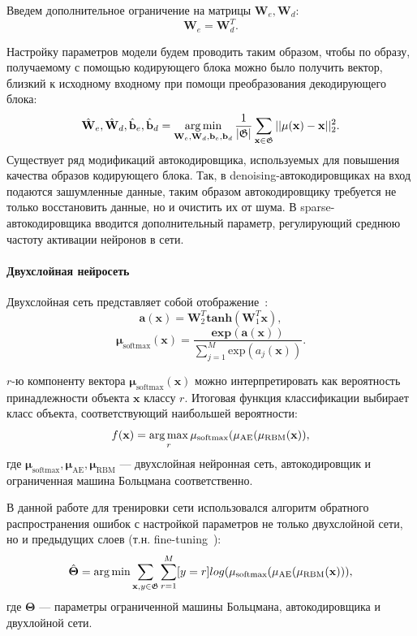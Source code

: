 \documentclass[12pt,twoside]{article}
\begin{document}
Введем дополнительное ограничение на матрицы $\mathbf{W}_e, \mathbf{W}_d$:
\[
    \mathbf{W}_e = \mathbf{W}_d^T.
\]

Настройку параметров модели будем проводить таким образом, чтобы по образу, получаемому с помощью кодирующего блока можно было получить вектор, близкий к исходному входному при помощи преобразования декодирующего блока:
\[
    \hat{\mathbf{W}}_e,\hat{\mathbf{W}}_d,\hat{\mathbf{b}}_e, \hat{\mathbf{b}}_d = \argmin_{\mathbf{W}_e,\mathbf{W}_d,\mathbf{b}_e, \mathbf{b}_d} \frac{1}{|\mathfrak{G}|}\sum_{\mathbf{x} \in \mathfrak{G}} ||\mu(\mathbf{x})-\mathbf{x}||^2_2.
\]
Существует ряд модификаций автокодировщика, используемых для повышения качества образов кодирующего блока. Так, в denoising-автокодировщиках на вход подаются зашумленные данные, таким образом автокодировщику требуется не только восстановить данные, но и очистить их от шума. В sparse-автокодировщика вводится дополнительный параметр, регулирующий среднюю частоту активации нейронов в сети.

\paragraph{Двухслойная нейросеть}
Двухслойная сеть представляет собой отображение~\cite{sm}:
\[
    \mathbf{a}(\mathbf{x}) = \mathbf{W}^T_2 \textbf{tanh}(\mathbf{W}^T_1 \mathbf{x}),
\]
\[
    \mathbf{\mu}_\text{softmax}(\mathbf{x}) =  \frac{\textbf{exp}(\mathbf{a}(\mathbf{x}))}{\sum_{j=1}^M \text{exp}({a}_j(\mathbf{x}))}.
\]

$r$-ю компоненту вектора $\mathbf{\mu}_\text{softmax}(\mathbf{x})$ можно интерпретировать как вероятность принадлежности объекта $\mathbf{x}$ классу $r$. Итоговая функция классификации выбирает класс объекта, соответствующий наибольшей вероятности:
\[
    f(\mathbf{x}) = \argmax_r \mu_\text{softmax}(\mathbf{\mu}_\text{AE}(\mathbf{\mu}_\text{RBM}(\mathbf{x})),
\]
где $\mathbf{\mu}_\text{softmax},\mathbf{\mu}_\text{AE}, \mathbf{\mu}_\text{RBM}$ --- двухслойная нейронная сеть, автокодировщик и ограниченная машина Больцмана соответственно.

В данной работе для тренировки сети  использовался алгоритм обратного распространения ошибок с настройкой параметров не только двухслойной сети, но и предыдущих слоев (т.н. fine-tuning~\cite{fine}):
\[
    \hat{\mathbf{\Theta}} = \argmin\sum_{\mathbf{x},y \in \mathfrak{G}}\sum_{r = 1}^M[y = r]log(\mu_\text{softmax}(\mathbf{\mu}_\text{AE}(\mathbf{\mu}_\text{RBM}(\mathbf{x}))),
\]
где $\mathbf{\Theta}$ --- параметры ограниченной машины Больцмана, автокодировщика и двухлойной сети.
\end{document}
